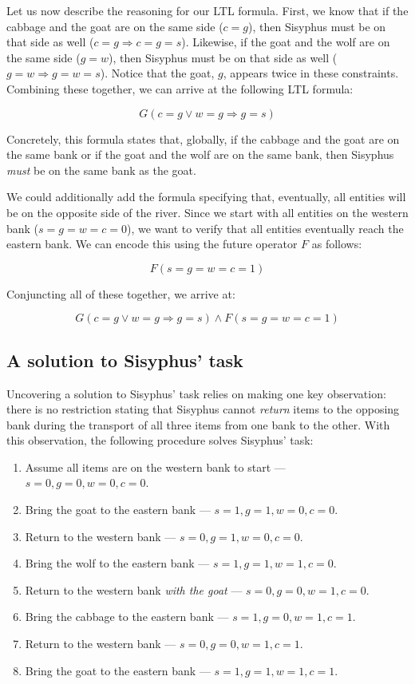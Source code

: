 \documentclass{article}
\begin{document}
Let us now describe the reasoning for our LTL formula. First, we know that if the cabbage and the goat are on the same side ($c = g$), then Sisyphus must be on that side as well ($c = g \Longrightarrow c = g = s$). Likewise, if the goat and the wolf are on the same side ($g = w$), then Sisyphus must be on that side as well ($g = w \Longrightarrow g = w = s$). Notice that the goat, $g$, appears twice in these constraints. Combining these together, we can arrive at the following LTL formula:

$$
G(c = g \lor w = g \Longrightarrow g = s)
$$

Concretely, this formula states that, globally, if the cabbage and the goat are on the same bank or if the goat and the wolf are on the same bank, then Sisyphus \emph{must} be on the same bank as the goat.

We could additionally add the formula specifying that, eventually, all entities will be on the opposite side of the river. Since we start with all entities on the western bank ($s = g = w = c = 0$), we want to verify that all entities eventually reach the eastern bank. We can encode this using the future operator $F$ as follows:

$$
F(s = g = w = c = 1)
$$

Conjuncting all of these together, we arrive at:

$$
G(c = g \lor w = g \Longrightarrow g = s) \land F(s = g = w = c = 1)
$$

\subsection{A solution to Sisyphus' task}

Uncovering a solution to Sisyphus' task relies on making one key observation: there is no restriction stating that Sisyphus cannot \emph{return} items to the opposing bank during the transport of all three items from one bank to the other. With this observation, the following procedure solves Sisyphus' task:

\begin{enumerate}
  \item Assume all items are on the western bank to start — $s = 0, g = 0, w = 0, c = 0$.
  \item Bring the goat to the eastern bank — $s = 1, g = 1, w = 0, c = 0$.
  \item Return to the western bank — $s = 0, g = 1, w = 0, c = 0$.
  \item Bring the wolf to the eastern bank — $s = 1, g = 1, w = 1, c = 0$.
  \item Return to the western bank \emph{with the goat} — $s = 0, g = 0, w = 1, c = 0$.
  \item Bring the cabbage to the eastern bank — $s = 1, g = 0, w = 1, c = 1$.
  \item Return to the western bank — $s = 0, g = 0, w = 1, c = 1$.
  \item Bring the goat to the eastern bank — $s = 1, g = 1, w = 1, c = 1$.
\end{enumerate}
\end{document}
